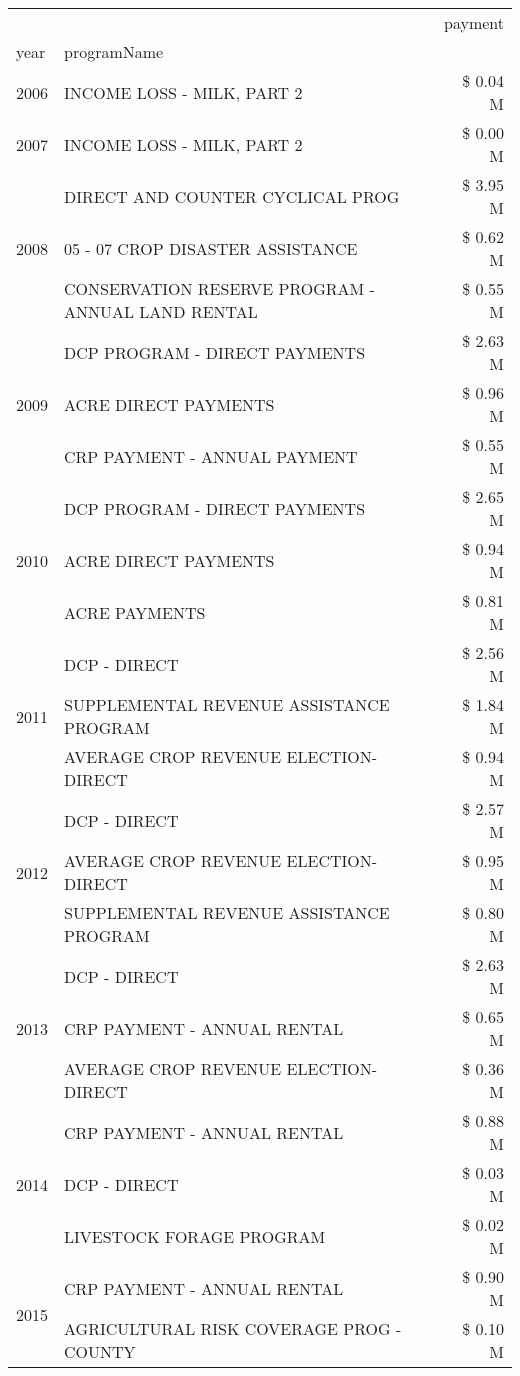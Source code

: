 \begin{tabular}{llr}
\toprule
 &  & payment \\
year & programName &  \\
\midrule
2006 & INCOME LOSS - MILK, PART 2 & \$ 0.04 M \\
\cline{1-3}
2007 & INCOME LOSS - MILK, PART 2 & \$ 0.00 M \\
\cline{1-3}
\multirow[t]{3}{*}{2008} & DIRECT AND COUNTER CYCLICAL PROG & \$ 3.95 M \\
 & 05 - 07 CROP DISASTER ASSISTANCE & \$ 0.62 M \\
 & CONSERVATION RESERVE PROGRAM - ANNUAL LAND RENTAL & \$ 0.55 M \\
\cline{1-3}
\multirow[t]{3}{*}{2009} & DCP PROGRAM - DIRECT PAYMENTS & \$ 2.63 M \\
 & ACRE DIRECT PAYMENTS & \$ 0.96 M \\
 & CRP PAYMENT - ANNUAL PAYMENT & \$ 0.55 M \\
\cline{1-3}
\multirow[t]{3}{*}{2010} & DCP PROGRAM - DIRECT PAYMENTS & \$ 2.65 M \\
 & ACRE DIRECT PAYMENTS & \$ 0.94 M \\
 & ACRE PAYMENTS & \$ 0.81 M \\
\cline{1-3}
\multirow[t]{3}{*}{2011} & DCP - DIRECT & \$ 2.56 M \\
 & SUPPLEMENTAL REVENUE ASSISTANCE PROGRAM & \$ 1.84 M \\
 & AVERAGE CROP REVENUE ELECTION-DIRECT & \$ 0.94 M \\
\cline{1-3}
\multirow[t]{3}{*}{2012} & DCP - DIRECT & \$ 2.57 M \\
 & AVERAGE CROP REVENUE ELECTION-DIRECT & \$ 0.95 M \\
 & SUPPLEMENTAL REVENUE ASSISTANCE PROGRAM & \$ 0.80 M \\
\cline{1-3}
\multirow[t]{3}{*}{2013} & DCP - DIRECT & \$ 2.63 M \\
 & CRP PAYMENT - ANNUAL RENTAL & \$ 0.65 M \\
 & AVERAGE CROP REVENUE ELECTION-DIRECT & \$ 0.36 M \\
\cline{1-3}
\multirow[t]{3}{*}{2014} & CRP PAYMENT - ANNUAL RENTAL & \$ 0.88 M \\
 & DCP - DIRECT & \$ 0.03 M \\
 & LIVESTOCK FORAGE PROGRAM & \$ 0.02 M \\
\cline{1-3}
\multirow[t]{3}{*}{2015} & CRP PAYMENT - ANNUAL RENTAL & \$ 0.90 M \\
 & AGRICULTURAL RISK COVERAGE PROG - COUNTY & \$ 0.10 M \\

\end{tabular}

